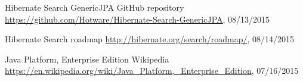 \begin{thebibliography}{100}
	 Hibernate Search GenericJPA GitHub repository
	\url{https://github.com/Hotware/Hibernate-Search-GenericJPA}, 08/13/2015
	
	 Hibernate Search roadmap
	\url{http://hibernate.org/search/roadmap/}, 08/14/2015
	
	 Java Platform, Enterprise Edition
	Wikipedia
	\url{https://en.wikipedia.org/wiki/Java_Platform,_Enterprise_Edition}, 07/16/2015
	
\end{thebibliography}

\pagebreak
~
